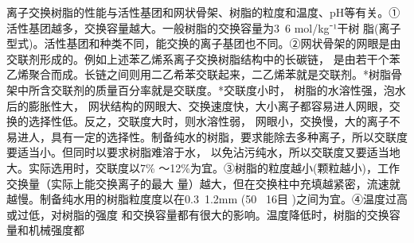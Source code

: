 离子交换树脂的性能与活性基团和网状骨架、树脂的粒度和温度、pH等有关。①活性基团越多，交换容量越大。一般树脂的交换容量为3~6 mol/kg⁻¹干树
脂(离子型式)。活性基团和种类不同，能交换的离子基团也不同。②网状骨架的网眼是由交联剂形成的。例如上述苯乙烯系离子交换树脂结构中的长碳链，
是由若干个苯乙烯聚合而成。长链之间则用二乙希苯交联起来，二乙烯苯就是交联剂。*树脂骨架中所含交联剂的质量百分率就是交联度。*交联度小时，
树脂的水溶性强，泡水后的膨胀性大， 网状结构的网眼大、交换速度快，大小离子都容易进人网眼，交换的选择性低。反之，交联度大时，则水溶性弱，
网眼小，交换慢，大的离子不易进人，具有一定的选择性。制备纯水的树脂，要求能除去多种离子，所以交联度要适当小。但同时以要求树脂难溶于水，
以免沾污纯水，所以交联度又要适当地大。实际选用时，交联度以7\% ～12\%为宜。③树脂的粒度越小(颗粒越小)，工作交换量（实际上能交换离子的最大
量）越大，但在交换柱中充填越紧密，流速就越慢。制备纯水用的树脂粒度度以在0.3~1.2mm (50~ 16目 )之间为宜。④温度过高或过低，对树脂的强度
和交换容量都有很大的影响。温度降低时，树脂的交换容量和机械强度都
